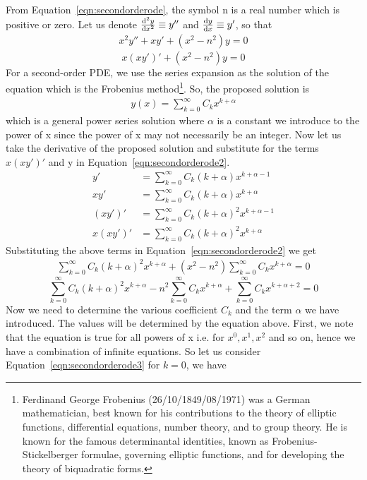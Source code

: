 From Equation~\eqref{eqn:secondorderode}, the symbol n is a real number which is positive or zero. Let us denote $\derivative[2]{y}{x} \equiv y''$ and $\derivative{y}{x} \equiv y'$, so that
\begin{align*}
x^2y'' + xy' + (x^2 - n^2)y = 0
\end{align*}
\begin{equation}
x(xy')' + (x^2 - n^2)y = 0
\label{eqn:secondorderode2}
\end{equation} 
For a second-order PDE, we use the series expansion as the solution of the equation which is the Frobenius method\footnote{
Ferdinand George Frobenius  (26/10/1849/08/1971) was a German mathematician, best known for his contributions to the theory of elliptic functions, differential equations, number theory, and to group theory. He is known for the famous determinantal identities, known as Frobenius- Stickelberger formulae, governing elliptic functions, and for developing the theory of biquadratic forms.
}. So, the proposed solution is 
\begin{align}
y(x) = \sum_{k=0}^{\infty}C_k x^{k + \alpha}
\label{eqn:besselfunctionsoln}
\end{align}
which is a general power series solution where $\alpha$ is a constant we introduce to the power of x since the power of x may not necessarily be an integer. Now let us take the derivative of the proposed solution and substitute for the terms $x(xy')'$ and y in Equation~\eqref{eqn:secondorderode2}.
\begin{align*}
y' &= \sum_{k=0}^{\infty}C_k (k + \alpha) x^{k + \alpha - 1}\\
xy' &= \sum_{k=0}^{\infty}C_k (k + \alpha) x^{k + \alpha}\\
(xy')' &= \sum_{k=0}^{\infty}C_k (k + \alpha)^2 x^{k + \alpha - 1}\\
x(xy')' &= \sum_{k=0}^{\infty}C_k (k + \alpha)^2 x^{k + \alpha}
\end{align*}
Substituting the above terms in Equation~\eqref{eqn:secondorderode2} we get
\begin{align*}
\sum_{k=0}^{\infty}C_k (k + \alpha)^2 x^{k + \alpha} + (x^2 - n^2)\sum_{k=0}^{\infty}C_k x^{k + \alpha} = 0
\end{align*}
\begin{dmath}
\sum_{k=0}^{\infty}C_k (k + \alpha)^2 x^{k + \alpha} - n^2\sum_{k=0}^{\infty}C_k x^{k + \alpha} + \sum_{k=0}^{\infty}C_k x^{k + \alpha + 2} = 0
\label{eqn:secondorderode3}
\end{dmath}
Now we need to determine the various coefficient $C_k$ and the term $\alpha$ we have introduced. The values will be determined by the equation above. First, we note that the equation is true for all powers of x i.e. for $x^0, x^1, x^2$ and so on, hence we have a combination of infinite equations. So let us consider Equation~\eqref{eqn:secondorderode3} for $k=0$, we have 
